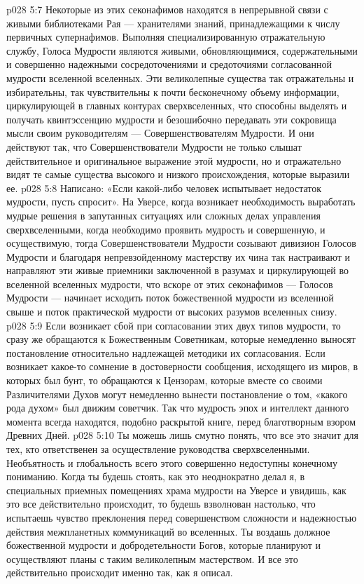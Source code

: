 \vs p028 5:7 \bibnobreakspace {} Некоторые из этих секонафимов находятся в непрерывной связи с живыми библиотеками Рая --- хранителями знаний, принадлежащими к числу первичных супернафимов. Выполняя специализированную отражательную службу, Голоса Мудрости являются живыми, обновляющимися, содержательными и совершенно надежными сосредоточениями и средоточиями согласованной мудрости вселенной вселенных. Эти великолепные существа так отражательны и избирательны, так чувствительны к почти бесконечному объему информации, циркулирующей в главных контурах сверхвселенных, что способны выделять и получать квинтэссенцию мудрости и безошибочно передавать эти сокровища мысли своим руководителям --- Совершенствователям Мудрости. И они действуют так, что Совершенствователи Мудрости не только слышат действительное и оригинальное выражение этой мудрости, но и отражательно видят те самые существа высокого и низкого происхождения, которые выразили ее.
\vs p028 5:8 Написано: «Если какой\hyp{}либо человек испытывает недостаток мудрости, пусть спросит». На Уверсе, когда возникает необходимость выработать мудрые решения в запутанных ситуациях или сложных делах управления сверхвселенными, когда необходимо проявить мудрость и совершенную, и осуществимую, тогда Совершенствователи Мудрости созывают дивизион Голосов Мудрости и благодаря непревзойденному мастерству их чина так настраивают и направляют эти живые приемники заключенной в разумах и циркулирующей во вселенной вселенных мудрости, что вскоре от этих секонафимов --- Голосов Мудрости --- начинает исходить поток божественной мудрости из вселенной свыше и поток практической мудрости от высоких разумов вселенных снизу.
\vs p028 5:9 Если возникает сбой при согласовании этих двух типов мудрости, то сразу же обращаются к Божественным Советникам, которые немедленно выносят постановление относительно надлежащей методики их согласования. Если возникает какое\hyp{}то сомнение в достоверности сообщения, исходящего из миров, в которых был бунт, то обращаются к Цензорам, которые вместе со своими Различителями Духов могут немедленно вынести постановление о том, «какого рода духом» был движим советчик. Так что мудрость эпох и интеллект данного момента всегда находятся, подобно раскрытой книге, перед благотворным взором Древних Дней.
\vs p028 5:10 Ты можешь лишь смутно понять, что все это значит для тех, кто ответственен за осуществление руководства сверхвселенными. Необъятность и глобальность всего этого совершенно недоступны конечному пониманию. Когда ты будешь стоять, как это неоднократно делал я, в специальных приемных помещениях храма мудрости на Уверсе и увидишь, как это все действительно происходит, то будешь взволнован настолько, что испытаешь чувство преклонения перед совершенством сложности и надежностью действия межпланетных коммуникаций во вселенных. Ты воздашь должное божественной мудрости и добродетельности Богов, которые планируют и осуществляют планы с таким великолепным мастерством. И все это действительно происходит именно так, как я описал.
